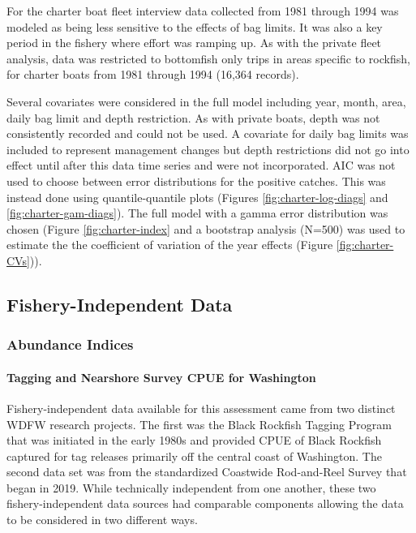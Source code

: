 \documentclass[11pt,
  english,
  letterpaper,
]{article}
\begin{document}
For the charter boat fleet interview data collected from 1981 through 1994 was modeled as being less sensitive to the effects of bag limits. It was also a key period in the fishery where effort was ramping up. As with the private fleet analysis, data was restricted to bottomfish only trips in areas specific to rockfish, for charter boats from 1981 through 1994 (16,364 records).

Several covariates were considered in the full model including year, month, area, daily bag limit and depth restriction. As with private boats, depth was not consistently recorded and could not be used. A covariate for daily bag limits was included to represent management changes but depth restrictions did not go into effect until after this data time series and were not incorporated. AIC was not used to choose between error distributions for the positive catches. This was instead done using quantile-quantile plots (Figures \ref{fig:charter-log-diags} and \ref{fig:charter-gam-diags}). The full model with a gamma error distribution was chosen (Figure \ref{fig:charter-index} and a bootstrap analysis (N=500) was used to estimate the the coefficient of variation of the year effects (Figure \ref{fig:charter-CVs})).

\hypertarget{fishery-independent-data}{%
\subsection{Fishery-Independent Data}\label{fishery-independent-data}}

\hypertarget{abundance-indices-1}{%
\subsubsection{Abundance Indices}\label{abundance-indices-1}}

\hypertarget{tagging-and-nearshore-survey-cpue-for-washington}{%
\paragraph{Tagging and Nearshore Survey CPUE for Washington}\label{tagging-and-nearshore-survey-cpue-for-washington}}

Fishery-independent data available for this assessment came from two distinct WDFW research projects. The first was the Black Rockfish Tagging Program that was initiated in the early 1980s and provided CPUE of Black Rockfish captured for tag releases primarily off the central coast of Washington. The second data set was from the standardized Coastwide Rod-and-Reel Survey that began in 2019. While technically independent from one another, these two fishery-independent data sources had comparable components allowing the data to be considered in two different ways.
\end{document}
